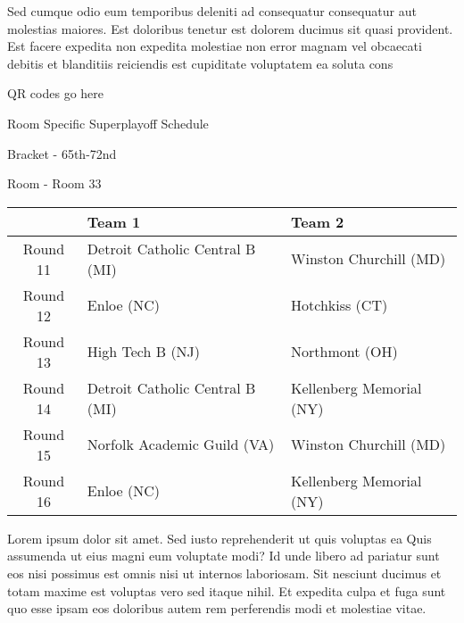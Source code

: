 \documentclass{article}%
\begin{document}
\newline%
    Sed cumque odio eum temporibus deleniti ad consequatur consequatur aut molestias maiores. Est doloribus tenetur est dolorem ducimus sit quasi provident. Est facere expedita non expedita molestiae non error magnam vel obcaecati debitis et blanditiis reiciendis est cupiditate voluptatem ea soluta cons%
\vspace*{140pt}%
\begin{center}%
\begin{Huge}%
QR codes go here%
\end{Huge}%
\end{center}%
\newpage%
\begin{center}%
\begin{Huge}%
Room Specific Superplayoff Schedule%
\end{Huge}%
\vspace*{8pt}%
\linebreak%
\begin{Large}%
Bracket {-} 65th{-}72nd%
\end{Large}%
\vspace*{8pt}%
\linebreak%
\vspace*{8pt}%
\begin{Large}%
Room {-} Room 33%
\end{Large}%
\end{center}%
%
\begin{tabularx}{\textwidth}{|c|Y|Y|}%
\hline%
&Team 1&Team 2\\%
\hline%
Round 11&Detroit Catholic Central B (MI)&Winston Churchill (MD)\\%
Round 12&Enloe (NC)&Hotchkiss (CT)\\%
Round 13&High Tech B (NJ)&Northmont (OH)\\%
Round 14&Detroit Catholic Central B (MI)&Kellenberg Memorial (NY)\\%
Round 15&Norfolk Academic Guild (VA)&Winston Churchill (MD)\\%
Round 16&Enloe (NC)&Kellenberg Memorial (NY)\\%
\hline%
\end{tabularx}%
\vspace*{8pt}%
\newline%
    Lorem ipsum dolor sit amet. Sed iusto reprehenderit ut quis voluptas ea Quis assumenda ut eius magni eum voluptate modi? Id unde libero ad pariatur sunt eos nisi possimus est omnis nisi ut internos laboriosam. Sit nesciunt ducimus et totam maxime est voluptas vero sed itaque nihil. Et expedita culpa et fuga sunt quo esse ipsam eos doloribus autem rem perferendis modi et molestiae vitae.\newline%
\end{document}
